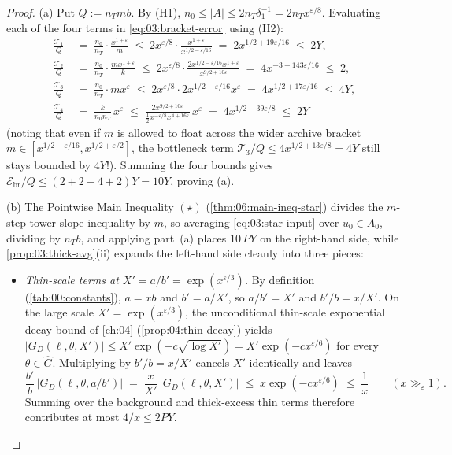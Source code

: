 
\begin{proof}
(a) Put $Q := n_T m b$. By (H1), $n_0 \le |A| \le 2 n_T \delta_1^{-1} = 2 n_T x^{\varepsilon/8}$. Evaluating each of the four terms in \eqref{eq:03:bracket-error} using (H2):
\begin{align*}
  \frac{\mathcal{T}_1}{Q}
  &\;=\; \frac{n_0}{n_T} \cdot \frac{x^{1+\varepsilon}}{m}
  \;\le\; 2 x^{\varepsilon/8} \cdot \frac{x^{1+\varepsilon}}{x^{1/2 - \varepsilon/16}}
  \;=\; 2 x^{1/2 + 19\varepsilon/16} \;\le\; 2 Y, \\
  \frac{\mathcal{T}_2}{Q}
  &\;=\; \frac{n_0}{n_T} \cdot \frac{m x^{1+\varepsilon}}{k}
  \;\le\; 2 x^{\varepsilon/8} \cdot \frac{2 x^{1/2 - \varepsilon/16} x^{1+\varepsilon}}{x^{9/2 + 10\varepsilon}}
  \;=\; 4 x^{-3 - 143\varepsilon/16} \;\le\; 2, \\
  \frac{\mathcal{T}_3}{Q}
  &\;=\; \frac{n_0}{n_T} \cdot m x^{\varepsilon}
  \;\le\; 2 x^{\varepsilon/8} \cdot 2 x^{1/2 - \varepsilon/16} x^{\varepsilon}
  \;=\; 4 x^{1/2 + 17\varepsilon/16} \;\le\; 4 Y, \\
  \frac{\mathcal{T}_4}{Q}
  &\;=\; \frac{k}{n_0 n_T}\, x^{\varepsilon}
  \;\le\; \frac{2 x^{9/2 + 10\varepsilon}}{\frac{1}{2} x^{-\varepsilon/8} x^{4 + 16\varepsilon}}\, x^{\varepsilon}
  \;=\; 4 x^{1/2 - 39\varepsilon/8} \;\le\; 2 Y
\end{align*}
(noting that even if $m$ is allowed to float across the wider archive bracket $m \in [x^{1/2 - \varepsilon/16}, x^{1/2 + \varepsilon/2}]$, the bottleneck term $\mathcal{T}_3/Q \le 4 x^{1/2 + 13\varepsilon/8} = 4Y$ still stays bounded by $4Y$!). Summing the four bounds gives $\mathcal{E}_{\mathrm{br}} / Q \le (2 + 2 + 4 + 2) Y = 10 Y$, proving (a).

(b) The Pointwise Main Inequality $(\star)$ (\cref{thm:06:main-ineq-star}) divides the $m$-step tower slope inequality by $m$, so averaging \eqref{eq:03:star-input} over $u_0 \in A_0$, dividing by $n_T b$, and applying part~(a) places $10\, P Y$ on the right-hand side, while \cref{prop:03:thick-avg}(ii) expands the left-hand side cleanly into three pieces:
\begin{itemize}
\item \emph{Thin-scale terms at $X' = a/b' = \exp(x^{\varepsilon/3})$.} By definition (\cref{tab:00:constants}), $a = x b$ and $b' = a / X'$, so $a / b' = X'$ and $b' / b = x / X'$. On the large scale $X' = \exp(x^{\varepsilon/3})$, the unconditional thin-scale exponential decay bound of \cref{ch:04} (\cref{prop:04:thin-decay}) yields $|G_D(\ell, \theta, X')| \le X' \exp(-c \sqrt{\log X'}) = X' \exp(-c x^{\varepsilon/6})$ for every $\theta \in \widehat{G}$. Multiplying by $b' / b = x / X'$ cancels $X'$ identically and leaves
  \[
    \frac{b'}{b}\,\bigl|G_D(\ell, \theta, a/b')\bigr|
    \;=\; \frac{x}{X'}\,\bigl|G_D(\ell, \theta, X')\bigr|
    \;\le\; x \exp(-c x^{\varepsilon/6}) \;\le\; \frac{1}{x} \qquad (x \gg_\varepsilon 1).
  \]
  Summing over the background and thick-excess thin terms therefore contributes at most $4/x \le 2 P Y$.


\end{itemize}
\end{proof}
